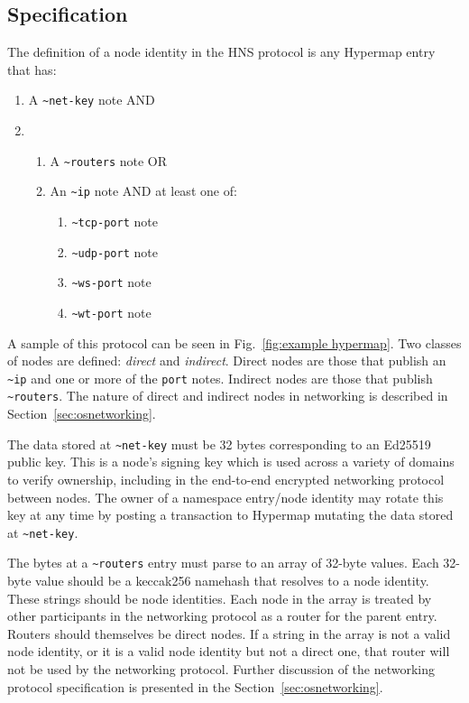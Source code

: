 \documentclass[runningheads]{llncs}
\begin{document}
\subsection{Specification}
\label{sec:hnsspec}

The definition of a node identity in the HNS protocol is any Hypermap entry that has:

\begin{enumerate}
    \item A \verb|~net-key| note AND
    \item \begin{enumerate}
        \item A \verb|~routers| note OR
        \item An \verb|~ip| note AND at least one of:
            \begin{enumerate}
                \item \verb|~tcp-port| note
                \item \verb|~udp-port| note
                \item \verb|~ws-port| note
                \item \verb|~wt-port| note
            \end{enumerate}
        \end{enumerate}
\end{enumerate}

A sample of this protocol can be seen in Fig.~\ref{fig:example hypermap}.
Two classes of nodes are defined: \textit{direct} and \textit{indirect}.
Direct nodes are those that publish an \verb|~ip| and one or more of the \verb|port| notes.
Indirect nodes are those that publish \verb|~routers|.
The nature of direct and indirect nodes in networking is described in Section~\ref{sec:osnetworking}.

The data stored at \verb|~net-key| must be 32 bytes corresponding to an Ed25519 public key.
This is a node's signing key which is used across a variety of domains to verify ownership, including in the end-to-end encrypted networking protocol between nodes.
The owner of a namespace entry/node identity may rotate this key at any time by posting a transaction to Hypermap mutating the data stored at \verb|~net-key|.

The bytes at a \verb|~routers| entry must parse to an array of 32-byte values.
Each 32-byte value should be a keccak256 namehash that resolves to a node identity.
These strings should be node identities.
Each node in the array is treated by other participants in the networking protocol as a router for the parent entry.
Routers should themselves be direct nodes.
If a string in the array is not a valid node identity, or it is a valid node identity but not a direct one, that router will not be used by the networking protocol.
Further discussion of the networking protocol specification is presented in the Section~\ref{sec:osnetworking}.
\end{document}
